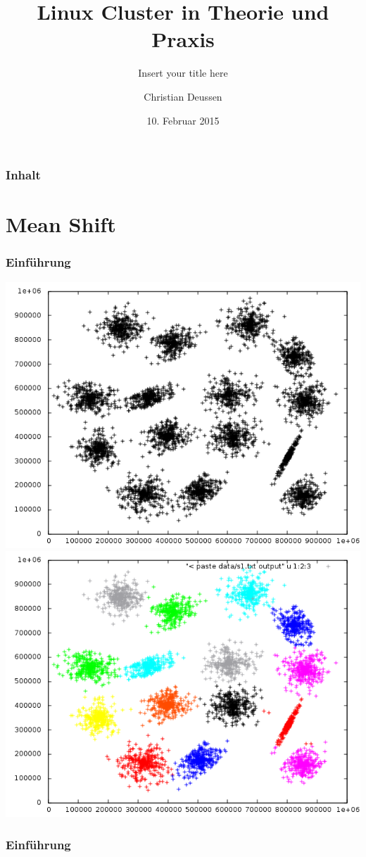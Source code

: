 \documentclass[10pt]{beamer}
\title{Linux Cluster in Theorie und Praxis}
\subtitle{Insert your title here}
\author{Christian Deussen}
\date{10. Februar 2015}
\institute[ZIH TUD]{Zentrum f\"ur Informationsdienste und Hochleistungsrechnen -- TU Dresden}
\begin{document}
\zihmaketitle

\begin{frame}
\frametitle{Inhalt}
	\tableofcontents
\end{frame}

\section{Mean Shift}
\begin{frame}
	\frametitle{Einf\"uhrung}
	\includegraphics[scale=0.34, keepaspectratio]{../output/pics/s1_black.png}
	\includegraphics[scale=0.34, keepaspectratio]{../output/pics/s1_colored.png}
\end{frame}
\begin{frame}
	\frametitle{Einf\"uhrung}
\end{frame}
\end{document}

